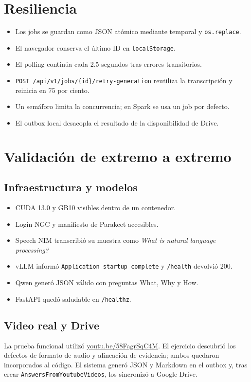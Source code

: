 \documentclass[11pt,a4paper]{article}
\begin{document}
\section{Resiliencia}

\begin{itemize}
  \item Los jobs se guardan como JSON atómico mediante temporal y
    \texttt{os.replace}.
  \item El navegador conserva el último ID en \texttt{localStorage}.
  \item El polling continúa cada 2.5 segundos tras errores transitorios.
  \item \texttt{POST /api/v1/jobs/\{id\}/retry-generation} reutiliza la
    transcripción y reinicia en 75 por ciento.
  \item Un semáforo limita la concurrencia; en Spark se usa un job por defecto.
  \item El outbox local desacopla el resultado de la disponibilidad de Drive.
\end{itemize}

\section{Validación de extremo a extremo}

\subsection{Infraestructura y modelos}
\begin{itemize}
  \item CUDA 13.0 y GB10 visibles dentro de un contenedor.
  \item Login NGC y manifiesto de Parakeet accesibles.
  \item Speech NIM transcribió su muestra como
    \emph{What is natural language processing?}
  \item vLLM informó \texttt{Application startup complete} y
    \texttt{/health} devolvió 200.
  \item Qwen generó JSON válido con preguntas What, Why y How.
  \item FastAPI quedó saludable en \texttt{/healthz}.
\end{itemize}

\subsection{Video real y Drive}
La prueba funcional utilizó
\href{https://youtu.be/58FagrSqC4M}{youtu.be/58FagrSqC4M}. El ejercicio descubrió
los defectos de formato de audio y alineación de evidencia; ambos quedaron
incorporados al código. El sistema generó JSON y Markdown en el outbox y, tras
crear \texttt{AnswersFromYoutubeVideos}, los sincronizó a Google Drive.
\end{document}
